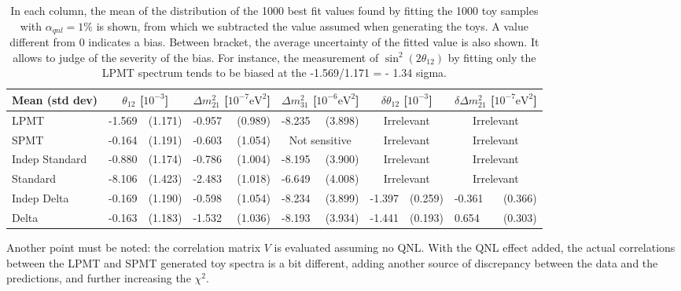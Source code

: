 \documentclass[../main.tex]{subfiles}
\begin{document}
\begin{table}[ht]
  \begin{footnotesize}
  \centering
  \begin{tabular}{l|lr|lr|lr|lr|lr|}
    Mean (std dev)  & \multicolumn{2}{c|}{$\theta_{12}$ [$10^{-3}$]} & \multicolumn{2}{c|}{$\Delta m^2_{21}$ [$10^{-7}\mathrm{eV}^{2}$]} & \multicolumn{2}{c|}{$\Delta m^2_{31}$ [$10^{-6}\mathrm{eV}^{2}$]} & \multicolumn{2}{c|}{$\delta \theta_{12}$ [$10^{-3}$]} & \multicolumn{2}{c|}{$\delta \Delta m^2_{21}$ [$10^{-7}\mathrm{eV}^{2}$]} \\
    \hline
    LPMT            & -1.569 & (1.171) & -0.957 & (0.989) & -8.235 & (3.898)       & \multicolumn{2}{c|}{Irrelevant} & \multicolumn{2}{c|}{Irrelevant}  \\
    SPMT            & -0.164 & (1.191) & -0.603 & (1.054) & \multicolumn{2}{c|}{Not sensitive} &\multicolumn{2}{c|}{Irrelevant} & \multicolumn{2}{c|}{Irrelevant}  \\
    Indep Standard  & -0.880 & (1.174) & -0.786 & (1.004) & -8.195 & (3.900)       & \multicolumn{2}{c|}{Irrelevant} & \multicolumn{2}{c|}{Irrelevant}  \\
    Standard        & -8.106 & (1.423) & -2.483 & (1.018) & -6.649 & (4.008)       & \multicolumn{2}{c|}{Irrelevant} & \multicolumn{2}{c|}{Irrelevant}  \\
    Indep Delta     & -0.169 & (1.190) & -0.598 & (1.054) & -8.234 & (3.899)       & -1.397 & (0.259)     & -0.361 & (0.366) \\
    Delta           & -0.163 & (1.183) & -1.532 & (1.036) & -8.193 & (3.934)       & -1.441 & (0.193)     & 0.654  & (0.303) \\
  \end{tabular}
  \end{footnotesize}
  \caption{In each column, the mean of the distribution of the 1000 best fit values found by fitting the 1000 toy samples with $\alpha_{qnl} = 1\%$ is shown, from which we subtracted the value assumed when generating the toys. A value different from 0 indicates a bias. Between bracket, the average uncertainty of the fitted value is also shown. It allows to judge of the severity of the bias. For instance, the measurement of $\sin^2(2 \theta_{12})$ by fitting only the LPMT spectrum tends to be biased at the -1.569/1.171 = - 1.34 sigma. }
  \label{tab:joint_fit:qnl_results}
\end{table}


Another point must be noted: the correlation matrix $V$ is evaluated assuming no QNL. With the QNL effect added, the actual correlations between the LPMT and SPMT generated toy spectra is a bit different, adding another source of discrepancy between the data and the predictions, and further increasing the $\chi^2$.
\end{document}
